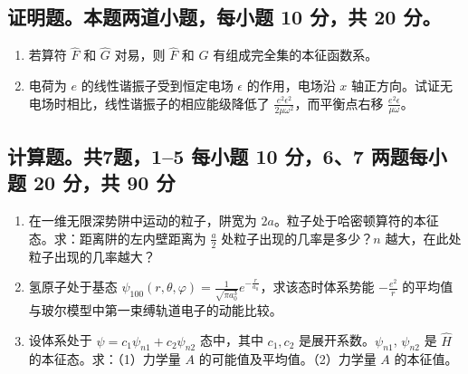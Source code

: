 \subsection{证明题。本题两道小题，每小题 10 分，共 20 分。}
\begin{enumerate}
    \item 若算符 $\hat{F}$ 和 $\hat{G}$ 对易，则 $\hat{F}$ 和 $\hat{G}$ 有组成完全集的本征函数系。
    \item 电荷为 $e$ 的线性谐振子受到恒定电场 $\epsilon$ 的作用，电场沿 $x$ 轴正方向。试证无电场时相比，线性谐振子的相应能级降低了 $\frac{e^2 \epsilon^2}{2\mu \omega^2}$，而平衡点右移 $\frac{e^2 \epsilon}{\mu \omega}$。
\end{enumerate}
\subsection{计算题。共7题，1--5 每小题 10 分，6、7 两题每小题 20 分，共 90 分}
\begin{enumerate}
    \item 在一维无限深势阱中运动的粒子，阱宽为 $2a$。粒子处于哈密顿算符的本征态。求：距离阱的左内壁距离为 $\frac{a}{2}$ 处粒子出现的几率是多少？$n$ 越大，在此处粒子出现的几率越大？
    \item 氢原子处于基态 $\psi_{100} (r, \theta, \varphi) = \frac{1}{\sqrt{\pi a_0^3}} e^{- \frac{r}{a_0}}$，求该态时体系势能 $-\frac{e^2}{r}$ 的平均值与玻尔模型中第一束缚轨道电子的动能比较。
    \item 设体系处于 $\psi = c_1 \psi_{n1} + c_2 \psi_{n2}$ 态中，其中 $c_1, c_2$ 是展开系数。$\psi_{n1}$, $\psi_{n2}$ 是 $\hat{H}$ 的本征态。求：（1）力学量 $A$ 的可能值及平均值。（2）力学量 $A$ 的本征值。
\end{enumerate}